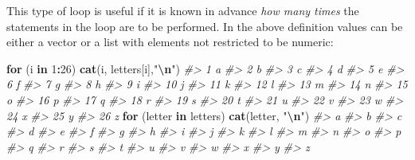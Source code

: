 \documentclass[
]{book}
\newenvironment{Shaded}{\begin{snugshade}}{\end{snugshade}}
\newcommand{\CommentTok}[1]{\textcolor[rgb]{0.56,0.35,0.01}{\textit{#1}}}
\newcommand{\ControlFlowTok}[1]{\textcolor[rgb]{0.13,0.29,0.53}{\textbf{#1}}}
\newcommand{\DecValTok}[1]{\textcolor[rgb]{0.00,0.00,0.81}{#1}}
\newcommand{\FunctionTok}[1]{\textcolor[rgb]{0.13,0.29,0.53}{\textbf{#1}}}
\newcommand{\NormalTok}[1]{#1}
\newcommand{\SpecialCharTok}[1]{\textcolor[rgb]{0.81,0.36,0.00}{\textbf{#1}}}
\newcommand{\StringTok}[1]{\textcolor[rgb]{0.31,0.60,0.02}{#1}}
\begin{document}
This type of loop is useful if it is known in advance \emph{{how many times}} the statements in the loop are to be performed. In the above definition values can be either a vector or a list with elements not restricted to be numeric:

\begin{Shaded}
\begin{Highlighting}[]
\ControlFlowTok{for}\NormalTok{ (i }\ControlFlowTok{in} \DecValTok{1}\SpecialCharTok{:}\DecValTok{26}\NormalTok{) }\FunctionTok{cat}\NormalTok{(i, letters[i],}\StringTok{"}\SpecialCharTok{\textbackslash{}n}\StringTok{"}\NormalTok{)}
\CommentTok{\#\textgreater{} 1 a }
\CommentTok{\#\textgreater{} 2 b }
\CommentTok{\#\textgreater{} 3 c }
\CommentTok{\#\textgreater{} 4 d }
\CommentTok{\#\textgreater{} 5 e }
\CommentTok{\#\textgreater{} 6 f }
\CommentTok{\#\textgreater{} 7 g }
\CommentTok{\#\textgreater{} 8 h }
\CommentTok{\#\textgreater{} 9 i }
\CommentTok{\#\textgreater{} 10 j }
\CommentTok{\#\textgreater{} 11 k }
\CommentTok{\#\textgreater{} 12 l }
\CommentTok{\#\textgreater{} 13 m }
\CommentTok{\#\textgreater{} 14 n }
\CommentTok{\#\textgreater{} 15 o }
\CommentTok{\#\textgreater{} 16 p }
\CommentTok{\#\textgreater{} 17 q }
\CommentTok{\#\textgreater{} 18 r }
\CommentTok{\#\textgreater{} 19 s }
\CommentTok{\#\textgreater{} 20 t }
\CommentTok{\#\textgreater{} 21 u }
\CommentTok{\#\textgreater{} 22 v }
\CommentTok{\#\textgreater{} 23 w }
\CommentTok{\#\textgreater{} 24 x }
\CommentTok{\#\textgreater{} 25 y }
\CommentTok{\#\textgreater{} 26 z}
\ControlFlowTok{for}\NormalTok{ (letter }\ControlFlowTok{in}\NormalTok{ letters) }\FunctionTok{cat}\NormalTok{(letter, }\StringTok{"}\SpecialCharTok{\textbackslash{}n}\StringTok{"}\NormalTok{)}
\CommentTok{\#\textgreater{} a }
\CommentTok{\#\textgreater{} b }
\CommentTok{\#\textgreater{} c }
\CommentTok{\#\textgreater{} d }
\CommentTok{\#\textgreater{} e }
\CommentTok{\#\textgreater{} f }
\CommentTok{\#\textgreater{} g }
\CommentTok{\#\textgreater{} h }
\CommentTok{\#\textgreater{} i }
\CommentTok{\#\textgreater{} j }
\CommentTok{\#\textgreater{} k }
\CommentTok{\#\textgreater{} l }
\CommentTok{\#\textgreater{} m }
\CommentTok{\#\textgreater{} n }
\CommentTok{\#\textgreater{} o }
\CommentTok{\#\textgreater{} p }
\CommentTok{\#\textgreater{} q }
\CommentTok{\#\textgreater{} r }
\CommentTok{\#\textgreater{} s }
\CommentTok{\#\textgreater{} t }
\CommentTok{\#\textgreater{} u }
\CommentTok{\#\textgreater{} v }
\CommentTok{\#\textgreater{} w }
\CommentTok{\#\textgreater{} x }
\CommentTok{\#\textgreater{} y }
\CommentTok{\#\textgreater{} z}
\end{Highlighting}
\end{Shaded}
\end{document}
